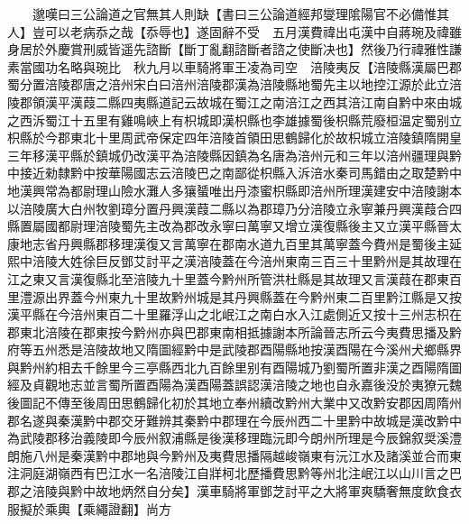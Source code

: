 　　邈嘆曰三公論道之官無其人則缺【書曰三公論道經邦燮理隂陽官不必備惟其人】豈可以老病忝之哉【忝辱也】遂固辭不受　五月漢費禕出屯漢中自蔣琬及禕雖身居於外慶賞刑威皆遥先諮斷【斷丁亂翻諮斷者諮之使斷决也】然後乃行禕雅性謙素當國功名略與琬比　秋九月以車騎將軍王凌為司空　涪陵夷反【涪陵縣漢屬巴郡蜀分置涪陵郡唐之涪州宋白曰涪州涪陵郡漢為涪陵縣地蜀先主以地控江源於此立涪陵郡領漢平漢葭二縣四夷縣道記云故城在蜀江之南涪江之西其涪江南自黔中來由城之西泝蜀江十五里有雞鳴峽上有枳城即漢枳縣也李雄據蜀後枳縣荒廢桓温定蜀别立枳縣於今郡東北十里周武帝保定四年涪陵首領田思鶴歸化於故枳城立涪陵鎮隋開皇三年移漢平縣於鎮城仍改漢平為涪陵縣因鎮為名唐為涪州元和三年以涪州疆理與黔中接近勑隸黔中按華陽國志云涪陵巴之南鄙從枳縣入泝涪水秦司馬錯由之取楚黔中地漢興常為都尉理山險水灘人多獽蜑唯出丹漆蜜枳縣即涪州所理漢建安中涪陵謝本以涪陵廣大白州牧劉璋分置丹興漢葭二縣以為郡璋乃分涪陵立永寧兼丹興漢葭合四縣置屬國都尉理涪陵蜀先主改為郡改永寧曰萬寧又增立漢復縣後主又立漢平縣晉太康地志省丹興縣郡移理漢復又言萬寧在郡南水道九百里其萬寧蓋今費州是蜀後主延熙中涪陵大姓徐巨反鄧艾討平之漢涪陵蓋在今涪州東南三百三十里黔州是其故理在江之東又言漢復縣北至涪陵九十里蓋今黔州所管洪杜縣是其故理又言漢葭在郡東百里澧源出界蓋今州東九十里故黔州城是其丹興縣蓋在今黔州東二百里黔江縣是又按漢平縣在今涪州東百二十里羅浮山之北岷江之南白水入江處側近又按十三州志枳在郡東北涪陵在郡東按今黔州亦與巴郡東南相抵據謝本所論晉志所云今夷費思播及黔府等五州悉是涪陵故地又隋圖經黔中是武陵郡酉陽縣地按漢酉陽在今溪州犬鄉縣界與黔州約相去千餘里今三亭縣西北九百餘里别有酉陽城乃劉蜀所置非漢之酉陽隋圖經及貞觀地志並言蜀所置酉陽為漢酉陽蓋誤認漢涪陵之地也自永嘉後没於夷獠元魏後圖記不傳至後周田思鶴歸化初於其地立奉州續改黔州大業中又改黔安郡因周隋州郡名遂與秦漢黔中郡交牙難辨其秦黔中郡理在今辰州西二十里黔中故城是漢改黔中為武陵郡移治義陵即今辰州叙浦縣是後漢移理臨沅即今朗州所理是今辰錦叙奨溪澧朗施八州是秦漢黔中郡地與今黔州及夷費思播隔越峻嶺東有沅江水及諸溪並合而東注洞庭湖嶺西有巴江水一名涪陵江自牂柯北歷播費思黔等州北注岷江以山川言之巴郡之涪陵與黔中故地炳然自分矣】漢車騎將軍鄧芝討平之大將軍爽驕奢無度飲食衣服擬於乘輿【乘繩證翻】尚方

